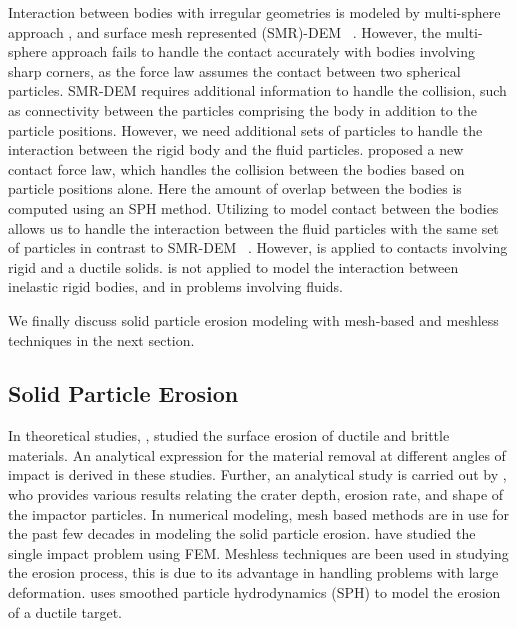 Interaction between bodies with irregular geometries is modeled by multi-sphere
approach \parencite{kruggel-emden_study_2008}, and surface mesh represented
(SMR)-DEM ~\parencite{zhan2021surface}. However, the multi-sphere approach fails to
handle the contact accurately with bodies involving sharp corners, as the force
law assumes the contact between two spherical particles. SMR-DEM requires
additional information to handle the collision, such as connectivity between the
particles comprising the body in addition to the particle positions. However, we
need additional sets of particles to handle the interaction between the rigid
body and the fluid particles. \textcite{mohseni2021particle} proposed a new contact
force law, which handles the collision between the bodies based on particle
positions alone. Here the amount of overlap between the bodies is computed using
an SPH method. Utilizing \parencite{mohseni2021particle} to model contact between
the bodies allows us to handle the interaction between the fluid particles with
the same set of particles in contrast to SMR-DEM ~\textcite{zhan2021surface}.
However, \parencite{mohseni2021particle} is applied to contacts involving rigid and
a ductile solids. \parencite{mohseni2021particle} is not applied to model the
interaction between inelastic rigid bodies, and in problems involving fluids.

We finally discuss solid particle erosion modeling with mesh-based and meshless
techniques in the next section.


\subsection{Solid Particle Erosion}
In theoretical studies, \textcite{finnie1972some}, \textcite{bitter1963study}
studied the surface erosion of ductile and brittle materials. An analytical
expression for the material removal at different angles of impact is derived in
these studies. Further, an analytical study is carried out by
\textcite{hutchings1977erosion}, who provides various results relating the
crater depth, erosion rate, and shape of the impactor particles. In numerical
modeling, mesh based methods are in use for the past few decades in modeling the
solid particle erosion. \textcite{molinari2002study,takaffoli2009finite} have
studied the single impact problem using FEM. Meshless techniques are been used
in studying the erosion process, this is due to its advantage in handling
problems with large deformation. \textcite{dong2016smoothed} uses smoothed
particle hydrodynamics (SPH) to model the erosion of a ductile target.


